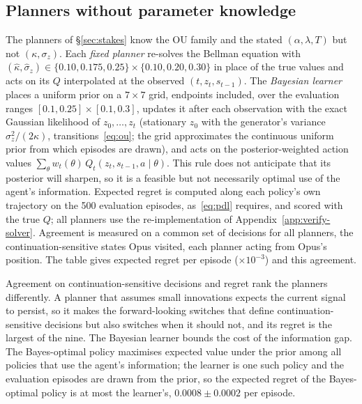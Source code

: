 \documentclass[10pt,a4paper,twocolumn]{article}
\newcommand{\sigz}{\sigma_z}
\begin{document}
\subsection{Planners without parameter knowledge}\label{app:verify-kappa}
The planners of \S\ref{sec:stakes} know the OU family and the stated $(\alpha,\lambda,T)$ but not $(\kappa,\sigz)$. Each \emph{fixed planner} re-solves the Bellman equation with $(\hat\kappa,\hat\sigma_z)\in\{0.10,0.175,0.25\}\times\{0.10,0.20,0.30\}$ in place of the true values and acts on its $Q$ interpolated at the observed $(t,z_t,s_{t-1})$. The \emph{Bayesian learner} places a uniform prior on a $7{\times}7$ grid, endpoints included, over the evaluation ranges $[0.1,0.25]\times[0.1,0.3]$, updates it after each observation with the exact Gaussian likelihood of $z_0,\dots,z_t$ (stationary $z_0$ with the generator's variance $\sigz^2/(2\kappa)$, transitions~\eqref{eq:ou}; the grid approximates the continuous uniform prior from which episodes are drawn), and acts on the posterior-weighted action values $\sum_\theta w_t(\theta)\,Q_t(z_t,s_{t-1},a\mid\theta)$. This rule does not anticipate that its posterior will sharpen, so it is a feasible but not necessarily optimal use of the agent's information. Expected regret is computed along each policy's own trajectory on the 500 evaluation episodes, as~\eqref{eq:pdl} requires, and scored with the true $Q$; all planners use the re-implementation of Appendix~\ref{app:verify-solver}. Agreement is measured on a common set of decisions for all planners, the continuation-sensitive states Opus visited, each planner acting from Opus's position. The table gives expected regret per episode ($\times10^{-3}$) and this agreement.
\begin{center}\scriptsize\setlength{\tabcolsep}{3pt}
\end{center}
Agreement on continuation-sensitive decisions and regret rank the planners differently. A planner that assumes small innovations expects the current signal to persist, so it makes the forward-looking switches that define continuation-sensitive decisions but also switches when it should not, and its regret is the largest of the nine. The Bayesian learner bounds the cost of the information gap. The Bayes-optimal policy maximises expected value under the prior among all policies that use the agent's information; the learner is one such policy and the evaluation episodes are drawn from the prior, so the expected regret of the Bayes-optimal policy is at most the learner's, $0.0008\pm0.0002$ per episode.
\end{document}

